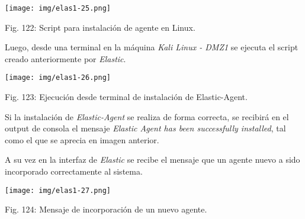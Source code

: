 \documentclass[12pt,oneside,a4paper]{book}
\begin{document}
\vspace{2em}

\begin{center}
    \texttt{[image: img/elas1-25.png]}
    
\vspace{0.1em}
    
    Fig. 122: Script para instalación de agente en Linux.
\end{center}

\vspace{2em}


\hspace{20pt}
Luego, desde una terminal en la máquina \textit{Kali Linux - DMZ1} se ejecuta el script creado anteriormente por \textit{Elastic}.

\vspace{2em}

\begin{center}
    \texttt{[image: img/elas1-26.png]}
    
\vspace{0.1em}
    
    Fig. 123: Ejecución desde terminal de instalación de Elastic-Agent.
\end{center}

\vspace{2em}

\hspace{20pt}
 Si la instalación de \textit{Elastic-Agent} se realiza de forma correcta, se recibirá en el output de consola el mensaje \textit{Elastic Agent has been successfully installed}, tal como el que se aprecia en imagen anterior.

\vspace{1em}

\hspace{20pt}
A su vez en la interfaz de \textit{Elastic} se recibe el mensaje que un agente nuevo a sido incorporado correctamente al sistema.

\vspace{2em}

\begin{center}
    \texttt{[image: img/elas1-27.png]}
    
\vspace{0.1em}
    
    Fig. 124: Mensaje de incorporación de un nuevo agente.
\end{center}

\vspace{2em}
\end{document}
